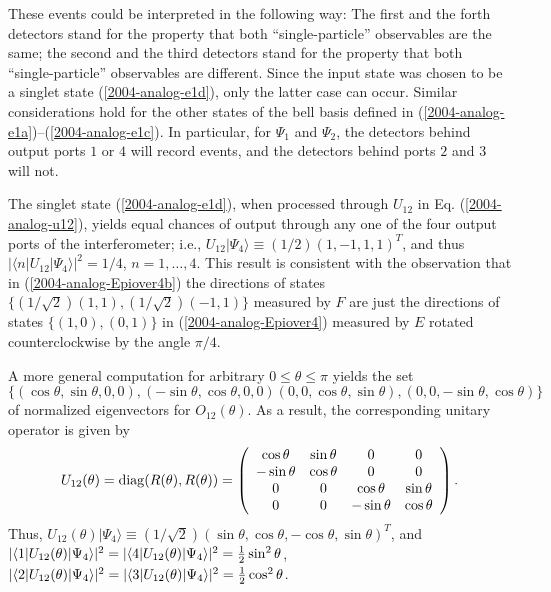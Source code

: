 \documentclass[12pt]{iopart}
\begin{document}
These events could be interpreted in the following way:
The first and the forth detectors stand for the property
that both ``single-particle'' observables are the same;
the second and the third detectors stand for the property
that both ``single-particle'' observables are  different.
Since the input state was chosen to be a singlet state (\ref{2004-analog-e1d}),
only the latter case can occur.
Similar considerations hold for the
other states of the bell basis defined in
(\ref{2004-analog-e1a})--(\ref{2004-analog-e1c}).
In particular, for $\Psi_1$ and $\Psi_2$,
the detectors behind output ports
$1$ or $4$ will record events, and the detectors behind ports $2$ and $3$
will not.


The singlet state (\ref{2004-analog-e1d}),
when processed through $U_{12}$ in Eq. (\ref{2004-analog-u12}),
yields equal chances of output
through any one of the four output ports of the interferometer; i.e.,
$U_{12}\vert \Psi_4\rangle \equiv (1/2)(1,-1,1,1)^T$,
and thus
$\vert \langle n \vert U_{12}\vert \Psi_4\rangle \vert^2 =1/4$,
$n=1,\ldots , 4$.
This result is consistent with the observation that
in
(\ref{2004-analog-Epiover4b})
the directions of states
$\{(1/\sqrt{2})(1,1),(1/\sqrt{2})(-1,1)\}$ measured by $F$
are just the directions of states
$\{(1,0),(0,1)\}$
in
(\ref{2004-analog-Epiover4})
measured by
$E$
rotated counterclockwise by the angle $\pi /4$.


A more general computation for arbitrary $0\le \theta \le \pi$
yields the  set
\[
\{
(\cos \theta , \sin \theta , 0, 0),
(-\sin \theta , \cos \theta , 0, 0)
(0, 0, \cos \theta , \sin \theta ),
(0, 0, -\sin \theta , \cos \theta )
\}
\]
of normalized eigenvectors for $O_{12}(\theta )$.
As a result, the corresponding unitary operator is given by
\begin{equation}
U_{12}(\theta ) =  {\rm diag}(R(\theta ),R(\theta)) =
\left(
\begin{array}{cccc}
\cos \theta & \sin \theta & 0& 0\\
-\sin \theta & \cos \theta & 0& 0\\
0& 0& \cos \theta & \sin \theta \\
0& 0& -\sin \theta & \cos \theta
\end{array}
\right)
.        \label{2004-analog-eunop12theta}
\end{equation}
Thus,
$U_{12}(\theta ) \vert \Psi_4\rangle \equiv  (1/\sqrt{2})
(\sin \theta ,\cos \theta ,-\cos \theta ,\sin \theta )^T$, and
$
\vert \langle 1 \vert U_{12}(\theta )\vert \Psi_4\rangle \vert^2 =
\vert \langle 4 \vert U_{12}(\theta )\vert \Psi_4\rangle \vert^2 =
{1\over 2}\sin^2 \theta$,
$
\vert \langle 2 \vert U_{12}(\theta )\vert \Psi_4\rangle \vert^2 =
\vert \langle 3 \vert U_{12}(\theta )\vert \Psi_4\rangle \vert^2 =
{1\over 2}\cos^2 \theta
$.
\end{document}
